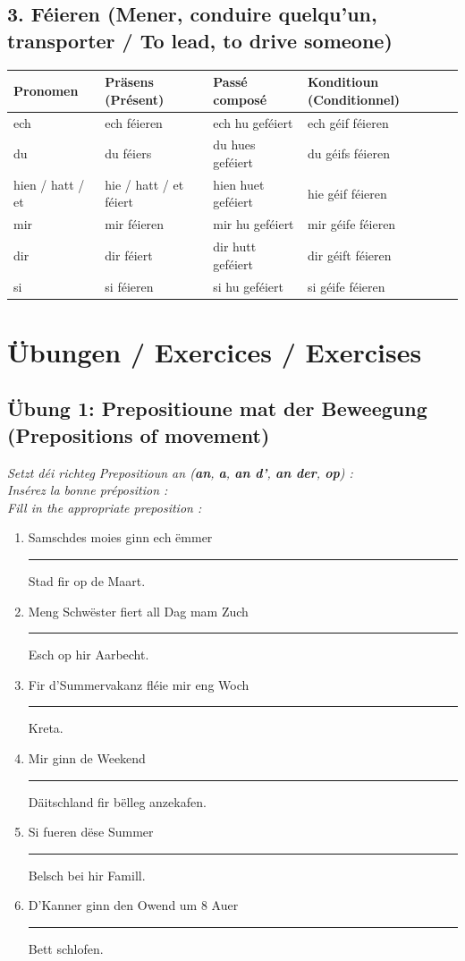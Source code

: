 \vspace{1em}

\subsection*{3. Féieren (Mener, conduire quelqu'un, transporter / To lead, to drive someone)}
\begin{center}
\small
\begin{tabular}{llll}
\toprule
\textbf{Pronomen} & \textbf{Präsens (Présent)} & \textbf{Passé composé} & \textbf{Konditioun (Conditionnel)} \\
\midrule
ech & ech féieren & ech hu geféiert & ech géif féieren \\
du & du féiers & du hues geféiert & du géifs féieren \\
hien / hatt / et & hie / hatt / et féiert & hien huet geféiert & hie géif féieren \\
mir & mir féieren & mir hu geféiert & mir géife féieren \\
dir & dir féiert & dir hutt geféiert & dir géift féieren \\
si & si féieren & si hu geféiert & si géife féieren \\
\bottomrule
\end{tabular}
\end{center}

\vspace{1.5em}

\section[Übungen / Exercises]{Übungen / Exercices / Exercises}

\subsection*{Übung 1: Prepositioune mat der Beweegung (Prepositions of movement)}
\textit{Setzt déi richteg Prepositioun an (\textbf{an}, \textbf{a}, \textbf{an d'}, \textbf{an der}, \textbf{op}) :}\\
\textit{Insérez la bonne préposition :}\\
\textit{Fill in the appropriate preposition :}

\begin{enumerate}
    \item Samschdes moies ginn ech ëmmer \rule{2.5cm}{0.4pt} Stad fir op de Maart.
    \item Meng Schwëster fiert all Dag mam Zuch \rule{2.5cm}{0.4pt} Esch op hir Aarbecht.
    \item Fir d'Summervakanz fléie mir eng Woch \rule{2.5cm}{0.4pt} Kreta.
    \item Mir ginn de Weekend \rule{2.5cm}{0.4pt} Däitschland fir bëlleg anzekafen.
    \item Si fueren dëse Summer \rule{2.5cm}{0.4pt} Belsch bei hir Famill.
    \item D'Kanner ginn den Owend um 8 Auer \rule{2.5cm}{0.4pt} Bett schlofen.
\end{enumerate}

